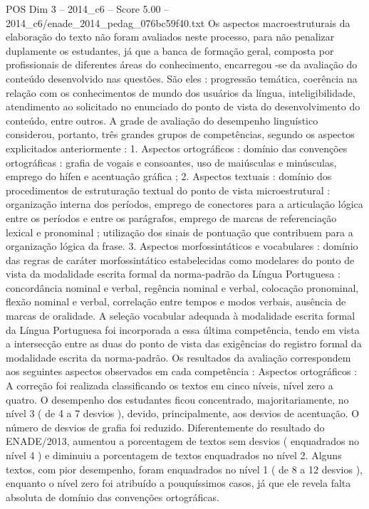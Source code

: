 \begin{textsample}{POS Dim 3 – 2014\_c6 – Score 5.00 – 2014\_c6/enade\_2014\_pedag\_076bc59f40.txt}
Os aspectos macroestruturais da elaboração do texto não foram avaliados neste processo, para não penalizar duplamente os estudantes, já que a banca de formação geral, composta por profissionais de diferentes áreas do conhecimento, encarregou -se da avaliação do conteúdo desenvolvido nas questões.
São eles : progressão temática, coerência na relação com os conhecimentos de mundo dos usuários da língua, inteligibilidade, atendimento ao solicitado no enunciado do ponto de vista do desenvolvimento do conteúdo, entre outros.
A grade de avaliação do desempenho linguístico considerou, portanto, três grandes grupos de competências, segundo os aspectos explicitados anteriormente : 1.
Aspectos ortográficos : domínio das convenções ortográficas : grafia de vogais e consoantes, uso de maiúsculas e minúsculas, emprego do hífen e acentuação gráfica ; 2.
Aspectos textuais : domínio dos procedimentos de estruturação textual do ponto de vista microestrutural : organização interna dos períodos, emprego de conectores para a articulação lógica entre os períodos e entre os parágrafos, emprego de marcas de referenciação lexical e pronominal ; utilização dos sinais de pontuação que contribuem para a organização lógica da frase. 3.
Aspectos morfossintáticos e vocabulares : domínio das regras de caráter morfossintático estabelecidas como modelares do ponto de vista da modalidade escrita formal da norma-padrão da Língua Portuguesa : concordância nominal e verbal, regência nominal e verbal, colocação pronominal, flexão nominal e verbal, correlação entre tempos e modos verbais, ausência de marcas de oralidade.
A seleção vocabular adequada à modalidade escrita formal da Língua Portuguesa foi incorporada a essa última competência, tendo em vista a intersecção entre as duas do ponto de vista das exigências do registro formal da modalidade escrita da norma-padrão.
Os resultados da avaliação correspondem aos seguintes aspectos observados em cada competência : Aspectos ortográficos : A correção foi realizada classificando os textos em cinco níveis, nível zero a quatro.
O desempenho dos estudantes ficou concentrado, majoritariamente, no nível 3 ( de 4 a 7 desvios ), devido, principalmente, aos desvios de acentuação.
O número de desvios de grafia foi reduzido.
Diferentemente do resultado do ENADE/2013, aumentou a porcentagem de textos sem desvios ( enquadrados no nível 4 ) e diminuiu a porcentagem de textos enquadrados no nível 2.
Alguns textos, com pior desempenho, foram enquadrados no nível 1 ( de 8 a 12 desvios ), enquanto o nível zero foi atribuído a pouquíssimos casos, já que ele revela falta absoluta de domínio das convenções ortográficas.

\end{textsample}
